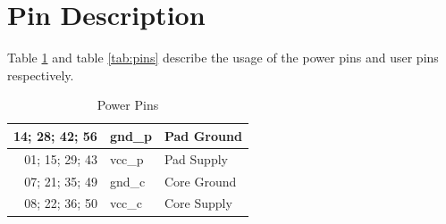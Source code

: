 \section{Pin Description}
Table \ref{tab:power_pins} and table \ref{tab:pins} describe the usage of the power pins and user pins respectively.
\begin{table}[!tbph]
 \caption{Power Pins}
 \label{tab:power_pins}
 \centering\begin{tabular}{|r| l| l|} \hline
14; 28; 42; 56 & gnd\_p & Pad Ground \\ \hline
01; 15; 29; 43 & vcc\_p & Pad Supply \\ \hline
07; 21; 35; 49 & gnd\_c & Core Ground \\ \hline
08; 22; 36; 50 & vcc\_c & Core Supply \\ \hline
 \end{tabular}

\end{table}
